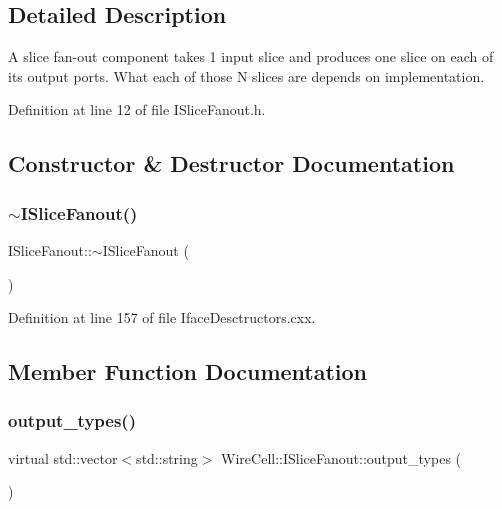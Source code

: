 \subsection{Detailed Description}
A slice fan-\/out component takes 1 input slice and produces one slice on each of its output ports. What each of those N slices are depends on implementation. 

Definition at line 12 of file I\+Slice\+Fanout.\+h.



\subsection{Constructor \& Destructor Documentation}
\mbox{\label{class_wire_cell_1_1_i_slice_fanout_a7af6570c9d570417bcbe1c0e538bff7b}} 
\subsubsection{\texorpdfstring{$\sim$\+I\+Slice\+Fanout()}{~ISliceFanout()}}
{\footnotesize\ttfamily I\+Slice\+Fanout\+::$\sim$\+I\+Slice\+Fanout (\begin{DoxyParamCaption}{ }\end{DoxyParamCaption})\hspace{0.3cm}{\ttfamily [virtual]}}



Definition at line 157 of file Iface\+Desctructors.\+cxx.



\subsection{Member Function Documentation}
\mbox{\label{class_wire_cell_1_1_i_slice_fanout_abde53bdfe0cef64ba3b05edcf111db65}} 
\subsubsection{\texorpdfstring{output\+\_\+types()}{output\_types()}}
{\footnotesize\ttfamily virtual std\+::vector$<$std\+::string$>$ Wire\+Cell\+::\+I\+Slice\+Fanout\+::output\+\_\+types (\begin{DoxyParamCaption}{ }\end{DoxyParamCaption})\hspace{0.3cm}{\ttfamily [pure virtual]}}



